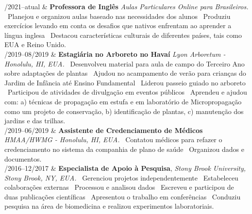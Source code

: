 \documentclass[11pt, a4paper]{article}
\newcommand{\Duration}[2]{\fontsize{10pt}{0}\selectfont #1--#2}
\begin{document}
\begin{EntriesTable}

	\Duration{02/2021}{atual}  &
	\textbf{Professora de Inglês}
	\newline
	\textit{Aulas Particulares Online para Brasileiros.}
	\newline
	\textbullet \ Planejou e organizou aulas baseado nas necessidades dos alunos 
	\textbullet \ Produziu exercícios levando em conta os desafios
	que nativos enfrentam ao aprender a língua inglesa
	\textbullet \ Destacou características culturais de diferentes países, 
	tais como EUA e Reino Unido.
	\\

	\Duration{06/2019}{08/2019}  &
	\textbf{Estagiária no Arboreto no Havaí}
	\newline
	\textit{Lyon Arboretum - Honolulu, HI, EUA.}
	\newline
	\textbullet \ Desenvolveu material para aula de campo do Terceiro 
	Ano sobre adaptações de plantas 
	\textbullet \ Ajudou no acampamento de verão para 
	crianças do Jardim de Infância até Ensino Fundamental 
	\textbullet \ Liderou passeio guiado no arboreto 
	\textbullet \ Participou de atividades de divulgação em 
	eventos públicos 
	\textbullet \ Aprendeu e ajudou com: a) técnicas de propagação em estufa
	e em laboratório de Micropropagação como um projeto de conservação, b)
	identificação de plantas, c) manutenção dos jardins e das trilhas.
	\\

	\Duration{03/2019}{06/2019}  &
	\textbf{Assistente de Credenciamento de Médicos}
	\newline
	\textit{HMAA/HWMG - Honolulu, HI, EUA.}
	\newline
	\textbullet \ Contatou médicos para refazer o credenciamento no sistema 
	da companhia de plano de saúde 
	\textbullet \ Organizou dados e documentos.
	\\

	\Duration{08/2016}{12/2017}  &
	\textbf{Especialista de Apoio à Pesquisa},
	\newline
	\textit{Stony Brook University, Stony Brook, NY, EUA.}
	\newline
	\textbullet \ Gerenciou projetos independentemente 
	\textbullet \ Estabeleceu colaborações externas 
	\textbullet \ Processou e analisou dados 
	\textbullet \ Escreveu e participou de duas publicações científicas 
	\textbullet \ Apresentou o trabalho em conferências 
	\textbullet\ Conduziu pesquisa na área de biomedicina e realizou 
	experimentos laboratoriais.
	\\

\end{EntriesTable}
\end{document}
